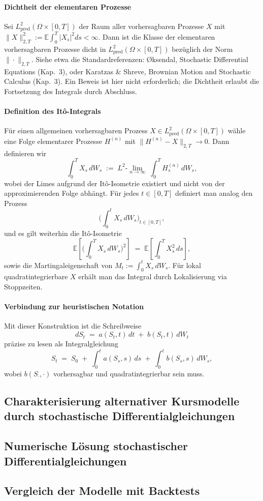 \paragraph{Dichtheit der elementaren Prozesse}
Sei $L^2_{\mathrm{pred}}(\Omega\times[0,T])$ der Raum aller vorhersagbaren Prozesse $X$ mit
$\|X\|_{2,T}^2 := \mathbb E\!\int_0^T |X_s|^2 ds <\infty$.
Dann ist die Klasse der elementaren vorhersagbaren Prozesse dicht in $L^2_{\mathrm{pred}}(\Omega\times[0,T])$ bezüglich der Norm $\|\cdot\|_{2,T}$. Siehe etwa die Standardreferenzen: \O{}ksendal, Stochastic Differential Equations (Kap.\ 3), oder Karatzas \& Shreve, Brownian Motion and Stochastic Calculus (Kap.\ 3). Ein Beweis ist hier nicht erforderlich; die Dichtheit erlaubt die Fortsetzung des Integrals durch Abschluss.

\paragraph{Definition des It\^o-Integrals}
Für einen allgemeinen vorhersagbaren Prozess $X\in L^2_{\mathrm{pred}}(\Omega\times[0,T])$ wähle eine Folge elementarer Prozesse $H^{(n)}$ mit
$\|H^{(n)}-X\|_{2,T}\to 0$. Dann definieren wir
$$
\int_0^T X_s\,dW_s \;:=\; L^2\text{-}\lim_{n\to\infty}\;\int_0^T H^{(n)}_s\,dW_s,
$$
wobei der Limes aufgrund der It\^o-Isometrie existiert und nicht von der approximierenden Folge abhängt. Für jedes $t\in[0,T]$ definiert man analog den Prozess
$$
\Big(\int_0^t X_s\,dW_s\Big)_{t\in[0,T]},
$$
und es gilt weiterhin die It\^o-Isometrie
$$
\mathbb E\!\left[\Big(\int_0^T X_s\,dW_s\Big)^{\!2}\right] \;=\; \mathbb E\!\left[\int_0^T X_s^{2}\,ds\right],
$$
sowie die Martingaleigenschaft von $M_t:=\int_0^t X_s\,dW_s$. Für lokal quadratintegrierbare $X$ erhält man das Integral durch Lokalisierung via Stoppzeiten.

\paragraph{Verbindung zur heuristischen Notation}
Mit dieser Konstruktion ist die Schreibweise
$$
dS_t \;=\; a(S_t,t)\,dt \;+\; b(S_t,t)\,dW_t
$$
präzise zu lesen als Integralgleichung
$$
S_t \;=\; S_0 \;+\; \int_0^t a(S_s,s)\,ds \;+\; \int_0^t b(S_s,s)\,dW_s,
$$
wobei $b(S_\cdot,\cdot)$ vorhersagbar und quadratintegrierbar sein muss.


\subsection{Charakterisierung alternativer Kursmodelle durch stochastische Differentialgleichungen}

\subsection{Numerische Lösung stochastischer Differentialgleichungen}

\subsection{Vergleich der Modelle mit Backtests}